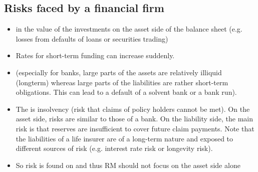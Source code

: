 \subsection*{Risks faced by a financial firm}
\begin{itemize}[leftmargin=*]
    \item {} in the value of the investments on the asset side of the balance sheet
(e.g. losses from defaults of loans or securities trading)
    \item {} Rates for short-term funding can increase suddenly.
    \item {} (especially for banks, large parts of the assets are relatively illiquid
(longterm) whereas large parts of the liabilities are rather short-term obligations. This can lead
to a default of a solvent bank or a bank run).
    \item The  is insolvency (risk that claims of policy holders
cannot be met). On the asset side, risks are similar to those of a bank. On the liability side, the
main risk is that reserves are insufficient to cover future claim payments. Note that the
liabilities of a life insurer are of a long-term nature and exposed to different sources of risk
(e.g. interest rate risk or longevity risk).
    \item So risk is found on  and thus RM should not focus on the asset
side alone
\end{itemize}





